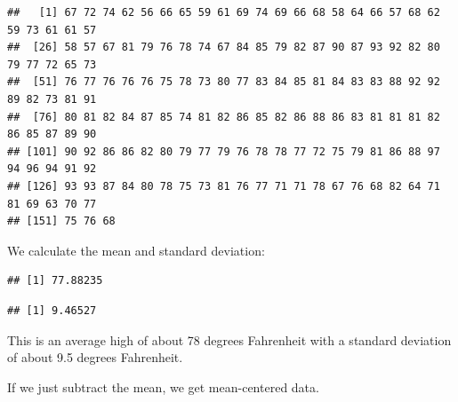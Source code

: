 \documentclass[
]{book}
\newenvironment{Shaded}{\begin{snugshade}}{\end{snugshade}}
\newcommand{\FunctionTok}[1]{\textcolor[rgb]{0.00,0.00,0.00}{#1}}
\newcommand{\NormalTok}[1]{#1}
\newcommand{\SpecialCharTok}[1]{\textcolor[rgb]{0.00,0.00,0.00}{#1}}
\begin{document}
\begin{Shaded}
\end{Shaded}

\begin{verbatim}
##   [1] 67 72 74 62 56 66 65 59 61 69 74 69 66 68 58 64 66 57 68 62 59 73 61 61 57
##  [26] 58 57 67 81 79 76 78 74 67 84 85 79 82 87 90 87 93 92 82 80 79 77 72 65 73
##  [51] 76 77 76 76 76 75 78 73 80 77 83 84 85 81 84 83 83 88 92 92 89 82 73 81 91
##  [76] 80 81 82 84 87 85 74 81 82 86 85 82 86 88 86 83 81 81 81 82 86 85 87 89 90
## [101] 90 92 86 86 82 80 79 77 79 76 78 78 77 72 75 79 81 86 88 97 94 96 94 91 92
## [126] 93 93 87 84 80 78 75 73 81 76 77 71 71 78 67 76 68 82 64 71 81 69 63 70 77
## [151] 75 76 68
\end{verbatim}

We calculate the mean and standard deviation:

\begin{Shaded}
\end{Shaded}

\begin{verbatim}
## [1] 77.88235
\end{verbatim}

\begin{Shaded}
\end{Shaded}

\begin{verbatim}
## [1] 9.46527
\end{verbatim}

This is an average high of about 78 degrees Fahrenheit with a standard deviation of about 9.5 degrees Fahrenheit.

If we just subtract the mean, we get mean-centered data.

\begin{Shaded}
\end{Shaded}
\end{document}
